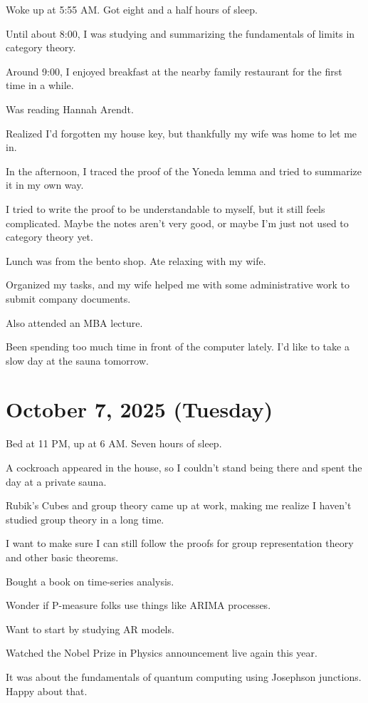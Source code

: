 \documentclass{article}
\begin{document}
Woke up at 5:55 AM. Got eight and a half hours of sleep.

Until about 8:00, I was studying and summarizing the fundamentals of limits in category theory.

Around 9:00, I enjoyed breakfast at the nearby family restaurant for the first time in a while.

Was reading Hannah Arendt.

Realized I'd forgotten my house key, but thankfully my wife was home to let me in.

In the afternoon, I traced the proof of the Yoneda lemma and tried to summarize it in my own way.

I tried to write the proof to be understandable to myself, but it still feels complicated. Maybe the notes aren't very good, or maybe I'm just not used to category theory yet.

Lunch was from the bento shop. Ate relaxing with my wife.

Organized my tasks, and my wife helped me with some administrative work to submit company documents.

Also attended an MBA lecture.

Been spending too much time in front of the computer lately. I'd like to take a slow day at the sauna tomorrow.

\section{October 7, 2025 (Tuesday)}

Bed at 11 PM, up at 6 AM. Seven hours of sleep.

A cockroach appeared in the house, so I couldn't stand being there and spent the day at a private sauna.

Rubik's Cubes and group theory came up at work, making me realize I haven't studied group theory in a long time.

I want to make sure I can still follow the proofs for group representation theory and other basic theorems.

Bought a book on time-series analysis.

Wonder if P-measure folks use things like ARIMA processes.

Want to start by studying AR models.

Watched the Nobel Prize in Physics announcement live again this year.

It was about the fundamentals of quantum computing using Josephson junctions. Happy about that.
\end{document}
